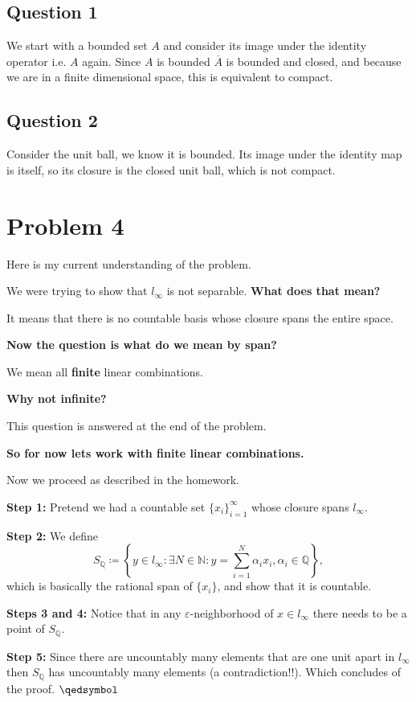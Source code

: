 \documentclass[12pt]{article}%
\begin{document}
\subsection*{Question 1}
We start with a bounded set $A$ and consider its image under the
identity operator i.e. $A$ again. Since $A$ is bounded $\overline{A}$ is
bounded and closed, and because we are in a finite dimensional space, this is
equivalent to compact.
\subsection*{Question 2}
Consider the unit ball, we know it is bounded. Its image under the identity map
is itself, so its closure is the closed unit ball, which is not compact.
\section*{Problem 4}
Here is my current understanding of the problem.

We were trying to show that $l_\infty$ is not separable. \textbf{What does that mean?}

It means that there is no countable basis whose closure spans the
entire space.

\textbf{Now the question is what do we mean by span?}

We mean all \textbf{finite} linear combinations.

\textbf{Why not infinite?}

This question is answered at the end of the problem.

\textbf{So for now lets work with finite linear combinations.}

Now we proceed as described in the homework.

\textbf{Step 1:} Pretend we had a countable set $\{x_i\}_{i=1}^\infty$ whose
closure spans $l_\infty$.

\textbf{Step 2:} We define
\[
	S_\mathbb{Q}\coloneqq\left\{ y\in l_\infty : \exists N \in \mathbb{N}:
	y=\sum_{i=1}^N \alpha_ix_i, \alpha_i \in \mathbb{Q}\right\},
\]
which is basically the rational span of $\{x_i\}$, and show that it is
countable.

\textbf{Steps 3 and 4:} Notice that in any $\varepsilon$-neighborhood of $x\in
l_\infty$ there needs to be a point of $S_\mathbb{Q}$.

\textbf{Step 5:} Since there are uncountably many elements that are one unit
apart in $l_\infty$ then $S_\mathbb{Q}$ has uncountably many elements (a
contradiction!!). Which concludes of the proof. $\qedsymbol$
\end{document}
